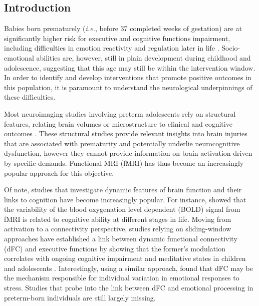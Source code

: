 \subsection{Introduction}


Babies born prematurely (\textit{i.e.}, before 37 completed weeks of gestation) are at significantly higher risk for executive and cognitive functions impairment, including difficulties in emotion reactivity and regulation later in life \citep{Evrard2011, Langerock2013, Yaari2018}. Socio-emotional abilities are, however, still in plain development during childhood and adolescence, suggesting that this age may still be within the intervention window. In order to identify and develop interventions that promote positive outcomes in this population, it is paramount to understand the neurological underpinnings of these difficulties. 

Most neuroimaging studies involving preterm adolescents rely on structural features, relating brain volumes or microstructure to clinical and cognitive outcomes \citep{Huning2018, Groeschel2019, Boardman2020}. These structural studies provide relevant insights into brain injuries that are associated with prematurity and potentially underlie neurocognitive dysfunction, however they cannot provide information on brain activation driven by specific demands. Functional MRI (fMRI) has thus become an increasingly popular approach for this objective.  %



Of note, studies that investigate dynamic features of brain function and their links to cognition have become increasingly popular. For instance, \citet{Garrett2013b} showed that the variability of the blood oxygenation level dependent (BOLD) signal from fMRI is related to cognitive ability at different stages in life. Moving from activation to a connectivity perspective, studies relying on sliding-window approaches have established a link between dynamic functional connectivity (dFC) and executive functions by showing that the former's modulation correlates with ongoing cognitive impairment \citep{Nguyen2017} and meditative states in children and adolescents \citep{Marusak2018}. Interestingly, using a similar approach, \citet{Tobia2017} found that dFC may be the mechanism responsible for individual variation in emotional responses to stress. Studies that probe into the link between dFC and emotional processing in preterm-born individuals are still largely missing. 


